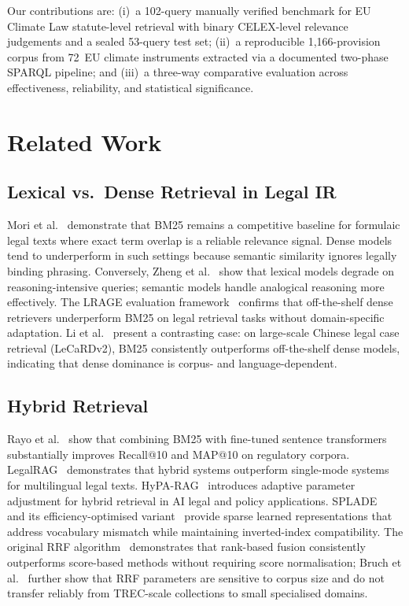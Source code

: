 \documentclass[conference]{IEEEtran}
\begin{document}
Our contributions are: (i)~a 102-query manually verified benchmark for
EU Climate Law statute-level retrieval with binary CELEX-level
relevance judgements and a sealed 53-query test set; (ii)~a
reproducible 1{,}166-provision corpus from 72~EU climate instruments
extracted via a documented two-phase SPARQL pipeline; and (iii)~a
three-way comparative evaluation across effectiveness, reliability, and
statistical significance.

\section{Related Work}

\subsection{Lexical vs.\ Dense Retrieval in Legal IR}

Mori et al.~\cite{1} demonstrate that BM25 remains a competitive
baseline for formulaic legal texts where exact term overlap is a
reliable relevance signal.
Dense models tend to underperform in such settings because semantic
similarity ignores legally binding phrasing.
Conversely, Zheng et al.~\cite{8} show that lexical models degrade on
reasoning-intensive queries; semantic models handle analogical
reasoning more effectively.
The LRAGE evaluation framework~\cite{14} confirms that off-the-shelf
dense retrievers underperform BM25 on legal retrieval tasks without
domain-specific adaptation.
Li et al.~\cite{19} present a contrasting case: on large-scale Chinese
legal case retrieval (LeCaRDv2), BM25 consistently outperforms
off-the-shelf dense models, indicating that dense dominance is
corpus- and language-dependent.

\subsection{Hybrid Retrieval}

Rayo et al.~\cite{3} show that combining BM25 with fine-tuned sentence
transformers substantially improves Recall@10 and MAP@10 on regulatory
corpora.
LegalRAG~\cite{10} demonstrates that hybrid systems outperform
single-mode systems for multilingual legal texts.
HyPA-RAG~\cite{2} introduces adaptive parameter adjustment for hybrid
retrieval in AI legal and policy applications.
SPLADE~\cite{5} and its efficiency-optimised variant~\cite{4} provide
sparse learned representations that address vocabulary mismatch while
maintaining inverted-index compatibility.
The original RRF algorithm~\cite{15} demonstrates that rank-based
fusion consistently outperforms score-based methods without requiring
score normalisation; Bruch et al.~\cite{18} further show that RRF
parameters are sensitive to corpus size and do not transfer reliably
from TREC-scale collections to small specialised domains.
\end{document}

